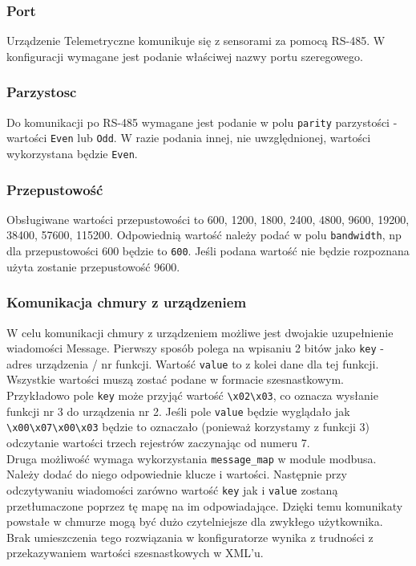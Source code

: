 \documentclass[11pt]{article}
\begin{document}
\subsubsection{Port}
Urządzenie Telemetryczne komunikuje się z sensorami za pomocą RS-485. W konfiguracji wymagane
jest podanie właściwej nazwy portu szeregowego.
\subsubsection{Parzystosc}
Do komunikacji po RS-485 wymagane jest podanie w polu \verb|parity| parzystości - wartości \verb|Even| lub \verb|Odd|. W razie podania
innej, nie uwzględnionej, wartości wykorzystana będzie \verb|Even|.
\subsubsection{Przepustowość}
Obsługiwane wartości przepustowości to 600, 1200, 1800, 2400, 4800, 9600, 19200, 38400, 57600, 115200. Odpowiednią wartość
należy podać w polu \verb|bandwidth|, np dla przepustowości 600 będzie to \verb|600|. Jeśli podana wartość nie będzie rozpoznana
użyta zostanie przepustowość 9600.


\subsubsection{Komunikacja chmury z urządzeniem}
W celu komunikacji chmury z urządzeniem możliwe jest dwojakie uzupełnienie wiadomości Message.
Pierwszy sposób polega na wpisaniu 2 bitów jako \verb|key| - adres urządzenia / nr funkcji. Wartość \verb|value| to z kolei
dane dla tej funkcji. Wszystkie wartości muszą zostać podane w formacie szesnastkowym.
Przykładowo pole \verb|key| może przyjąć wartość \verb|\x02\x03|, co oznacza wysłanie funkcji nr 3 do urządzenia nr 2. Jeśli pole
\verb|value| będzie wyglądało jak \verb|\x00\x07\x00\x03| będzie to oznaczało (ponieważ korzystamy z funkcji 3) odczytanie wartości
trzech rejestrów zaczynając od numeru 7.\\

Druga możliwość wymaga wykorzystania \verb|message_map| w module modbusa. Należy dodać do niego odpowiednie klucze i wartości.
Następnie przy odczytywaniu wiadomości zarówno wartość \verb|key| jak i \verb|value| zostaną przetłumaczone poprzez tę mapę na im odpowiadające.
Dzięki temu komunikaty powstałe w chmurze mogą być dużo czytelniejsze dla zwykłego użytkownika.\\

Brak umieszczenia tego rozwiązania w konfiguratorze wynika z trudności z przekazywaniem wartości szesnastkowych w XML'u.
\end{document}
